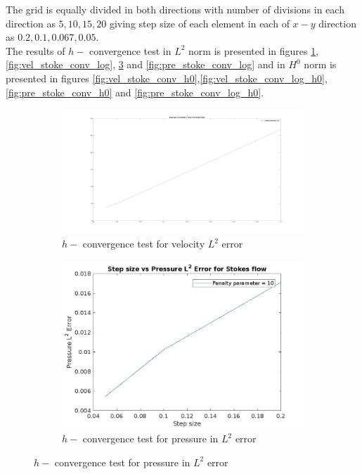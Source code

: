 \documentclass[a4paper]{book}
\begin{document}
The grid is equally divided in both directions with number of divisions in each direction as $5,10,15,20$ giving step size of each element in each of $x-y$ direction as $0.2,0.1,0.067,0.05$.\\

The results of $h-$ convergence test in $L^2$ norm is presented in figures \ref{fig:vel_stoke_conv},\ref{fig:vel_stoke_conv_log}, \ref{fig:pre_stoke_conv} and \ref{fig:pre_stoke_conv_log} and in $H^0$ norm is presented in figures \ref{fig:vel_stoke_conv_h0},\ref{fig:vel_stoke_conv_log_h0}, \ref{fig:pre_stoke_conv_h0} and \ref{fig:pre_stoke_conv_log_h0}. \\

\begin{figure}
\begin{subfigure}{\textwidth}	
  \includegraphics[width=\linewidth]{l2_velocity_stokes.jpg}
  \caption{$h-$ convergence test for velocity $L^2$ error}
  \label{fig:vel_stoke_conv}
\end{subfigure}
\begin{subfigure}{\textwidth}	
  \includegraphics[width=\linewidth]{l2_pressure_stokes.jpg}
  \caption{$h-$ convergence test for pressure in $L^2$ error}
  \label{fig:pre_stoke_conv}
\end{subfigure}
\end{figure}
\end{document}
